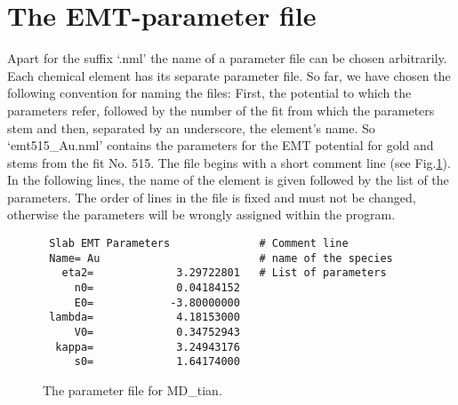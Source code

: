 \documentclass[twoside, 11pt, titlepage, captions=nooneline, a4paper, headsepline]{scrbook}%
\begin{document}
\section{The EMT-parameter file}
Apart for the suffix `.nml' the name of a parameter file can be chosen arbitrarily. Each chemical element has its separate parameter file. So far, we have chosen the following convention for naming the files: First, the potential to which the parameters refer, followed by the number of the fit from which the parameters stem and then, separated by an underscore, the element's name. So `emt515\_Au.nml' contains the parameters for the EMT potential for gold and stems from the fit No. 515. The file begins with a short comment line (see Fig.\ref{Fig:nmlfile}). In the following lines, the name of the element is given followed by the list of the parameters. The order of lines in the file is fixed and must not be changed, otherwise the parameters will be wrongly assigned within the program.
\begin{figure}[t!]
\begin{verbatim}
 Slab EMT Parameters              # Comment line
 Name= Au                         # name of the species
   eta2=             3.29722801   # List of parameters
     n0=             0.04184152
     E0=            -3.80000000
 lambda=             4.18153000
     V0=             0.34752943
  kappa=             3.24943176
     s0=             1.64174000
\end{verbatim}
\caption{\label{Fig:nmlfile}The parameter file for MD\_tian.}
\end{figure}
\end{document}
